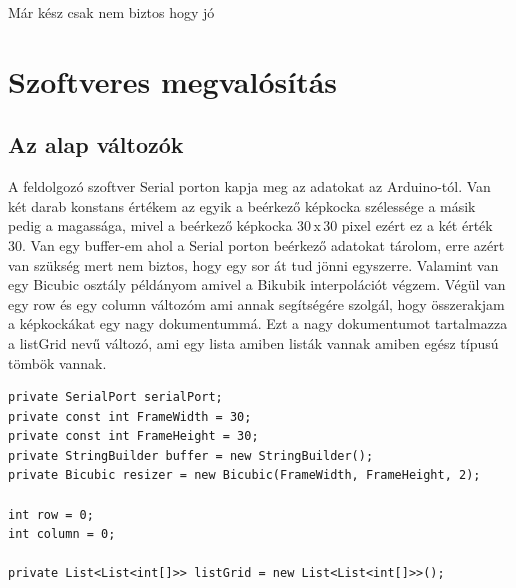 \documentclass[]{thesis-ekf}
\theoremstyle{definition}
\theoremstyle{remark}
\begin{document}
Már kész csak nem biztos hogy jó
\chapter{Szoftveres megvalósítás}


\section{Az alap változók}
A feldolgozó szoftver Serial porton kapja meg az adatokat az Arduino-tól. Van két darab konstans értékem az egyik a beérkező képkocka szélessége a másik pedig a magassága, mivel a beérkező képkocka 30\,x\,30 pixel ezért ez a két érték 30. Van egy buffer-em ahol a Serial porton beérkező adatokat tárolom, erre azért van szükség mert nem biztos, hogy egy sor át tud jönni egyszerre. Valamint van egy Bicubic osztály példányom amivel a Bikubik interpolációt végzem. Végül van egy row és egy column változóm ami annak segítségére szolgál, hogy összerakjam a képkockákat egy nagy dokumentummá. Ezt a nagy dokumentumot tartalmazza a listGrid nevű változó, ami egy lista amiben listák vannak amiben egész típusú tömbök vannak. 
\begin{lstlisting}[language=CSharp]
private SerialPort serialPort;
private const int FrameWidth = 30; 
private const int FrameHeight = 30; 
private StringBuilder buffer = new StringBuilder(); 
private Bicubic resizer = new Bicubic(FrameWidth, FrameHeight, 2);

int row = 0;
int column = 0;

private List<List<int[]>> listGrid = new List<List<int[]>>();
\end{lstlisting}
\end{document}
